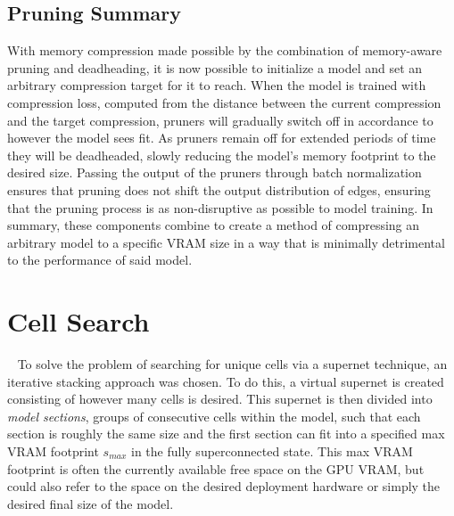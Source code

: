 \subsection{Pruning Summary}
With memory compression made possible by the combination of memory-aware pruning and deadheading,
it is now possible to initialize a model and set an arbitrary compression target for it to reach. When the model is trained with
compression loss, computed from the distance between the current compression and the target compression, pruners will
gradually switch off in accordance to however the model sees fit. As pruners remain off for extended periods of time they
will be deadheaded, slowly reducing the model's memory footprint to the desired size. Passing the output of the pruners through
batch normalization ensures that pruning does not shift the output distribution of edges, ensuring that the pruning process
is as non-disruptive as possible to model training. In summary, these components combine to create a method of compressing an arbitrary model
to a specific VRAM size in a way that is minimally detrimental to the performance of said model.

\section{Cell Search}~\label{sect:bonsai_cell_search}
To solve the problem of searching for unique cells via a supernet technique, an iterative stacking approach was chosen.
To do this, a virtual supernet is created consisting of however many cells is desired. This supernet is then divided into
\textit{model sections}, groups of consecutive cells within the model,
	such that each section is roughly the same size and the first section
	can fit into a specified max VRAM footprint $s_{max}$ in the fully superconnected state. This max VRAM footprint is often the currently
available free space on the GPU VRAM, but could also refer to the space on the desired deployment hardware or
simply the desired final size of the model.

